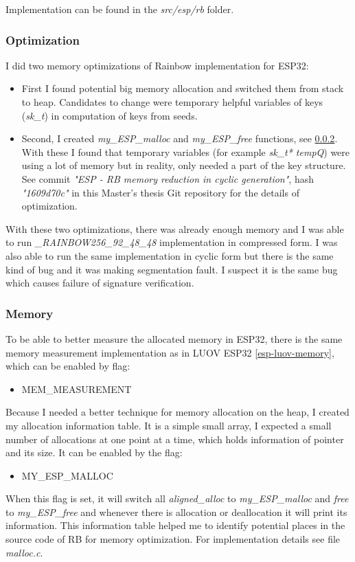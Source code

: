 \documentclass[thesis=M,english]{FITthesis}[2019/12/23]
\begin{document}
\bigskip
\noindent
Implementation can be found in the \textit{src/esp/rb} folder.

\subsubsection{Optimization} \label{rb-opti}
I did two memory optimizations of Rainbow implementation for ESP32:
\begin{itemize}
\item	First I found potential big memory allocation and switched them from stack to heap. Candidates to change were temporary helpful variables of keys (\textit{sk\_t}) in computation of keys from seeds.

\item	Second, I created \textit{my\_ESP\_malloc} and \textit{my\_ESP\_free} functions, see \ref{esp-rb-memory}. With these I found that temporary variables (for example \textit{sk\_t* tempQ}) were using a lot of memory but in reality, only needed a part of the key structure. See commit \textit{"ESP - RB memory reduction in cyclic generation"}, hash \textit{"1609d70c"} in this Master's thesis Git repository for the details of optimization.
\end{itemize}

With these two optimizations, there was already enough memory and I was able to run \textit{\_RAINBOW256\_92\_48\_48} implementation in compressed form. I was also able to run the same implementation in cyclic form but there is the same kind of bug and it was making segmentation fault. I suspect it is the same bug
which causes failure of signature verification.

\subsubsection{Memory} \label{esp-rb-memory}
To be able to better measure the allocated memory in ESP32, there is the same memory measurement implementation as in LUOV ESP32 \ref{esp-luov-memory}, which can be enabled by flag:
\begin{itemize}
\item	MEM\_MEASUREMENT
\end{itemize}

Because I needed a better technique for memory allocation on the heap, I created my allocation information table. It is a simple small array, I expected a small number of allocations at one point at a time, which holds information of pointer and its size.
It can be enabled by the flag:
\begin{itemize}
\item	MY\_ESP\_MALLOC
\end{itemize}
When this flag is set, it will switch all \textit{aligned\_alloc} to \textit{my\_ESP\_malloc} and \textit{free} to \textit{my\_ESP\_free} and whenever there is allocation or deallocation it will print its information.
This information table helped me to identify potential places in the source code of RB for memory optimization. For implementation details see file \textit{malloc.c}.
\end{document}
